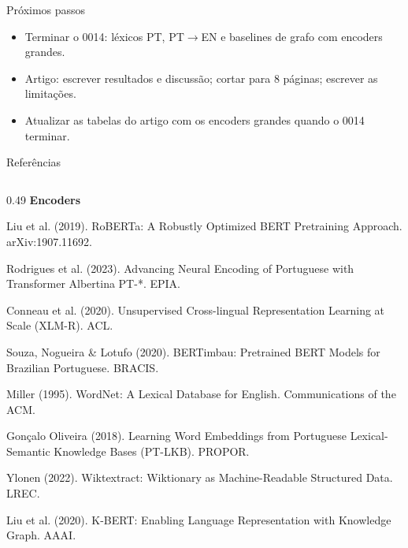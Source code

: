 \documentclass[aspectratio=169,10pt]{beamer}
\begin{document}
\begin{frame}{Próximos passos}
\small
\begin{itemize}\setlength{\itemsep}{5pt}
\item Terminar o 0014: léxicos PT, PT$\to$EN e baselines de grafo com encoders grandes.
\item Artigo: escrever resultados e discussão; cortar para 8 páginas; escrever as limitações.
\item Atualizar as tabelas do artigo com os encoders grandes quando o 0014 terminar.
\end{itemize}
\end{frame}

\begin{frame}[t]{Referências}
\fontsize{6.3}{7.4}\selectfont
\setlength{\parskip}{2pt}
\begin{columns}[T,onlytextwidth]
\begin{column}{0.49\textwidth}
{\bfseries Encoders}\par
Liu et al. (2019). RoBERTa: A Robustly Optimized BERT Pretraining Approach. arXiv:1907.11692.\par
Rodrigues et al. (2023). Advancing Neural Encoding of Portuguese with Transformer Albertina PT-*. EPIA.\par
Conneau et al. (2020). Unsupervised Cross-lingual Representation Learning at Scale (XLM-R). ACL.\par
Souza, Nogueira \& Lotufo (2020). BERTimbau: Pretrained BERT Models for Brazilian Portuguese. BRACIS.\par
{}\par
Miller (1995). WordNet: A Lexical Database for English. Communications of the ACM.\par
Gonçalo Oliveira (2018). Learning Word Embeddings from Portuguese Lexical-Semantic Knowledge Bases (PT-LKB). PROPOR.\par
Ylonen (2022). Wiktextract: Wiktionary as Machine-Readable Structured Data. LREC.\par
{}\par
Liu et al. (2020). K-BERT: Enabling Language Representation with Knowledge Graph. AAAI.\par

\end{column}
\end{columns}
\end{frame}
\end{document}
